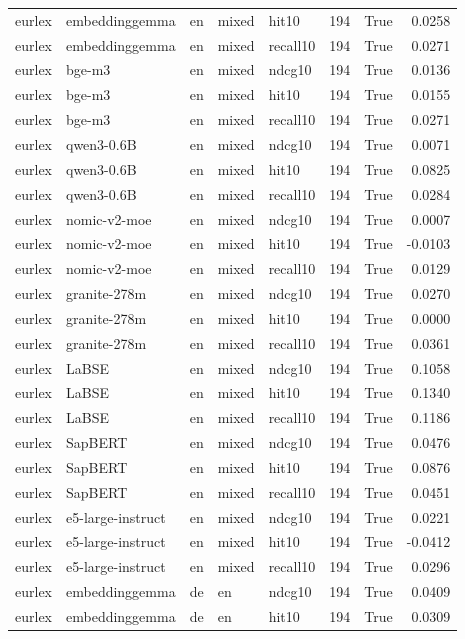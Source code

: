 \begin{tabular}{lllllrrr}
eurlex & embeddinggemma & en & mixed & hit10 & 194 & True & 0.0258 \\
eurlex & embeddinggemma & en & mixed & recall10 & 194 & True & 0.0271 \\
eurlex & bge-m3 & en & mixed & ndcg10 & 194 & True & 0.0136 \\
eurlex & bge-m3 & en & mixed & hit10 & 194 & True & 0.0155 \\
eurlex & bge-m3 & en & mixed & recall10 & 194 & True & 0.0271 \\
eurlex & qwen3-0.6B & en & mixed & ndcg10 & 194 & True & 0.0071 \\
eurlex & qwen3-0.6B & en & mixed & hit10 & 194 & True & 0.0825 \\
eurlex & qwen3-0.6B & en & mixed & recall10 & 194 & True & 0.0284 \\
eurlex & nomic-v2-moe & en & mixed & ndcg10 & 194 & True & 0.0007 \\
eurlex & nomic-v2-moe & en & mixed & hit10 & 194 & True & -0.0103 \\
eurlex & nomic-v2-moe & en & mixed & recall10 & 194 & True & 0.0129 \\
eurlex & granite-278m & en & mixed & ndcg10 & 194 & True & 0.0270 \\
eurlex & granite-278m & en & mixed & hit10 & 194 & True & 0.0000 \\
eurlex & granite-278m & en & mixed & recall10 & 194 & True & 0.0361 \\
eurlex & LaBSE & en & mixed & ndcg10 & 194 & True & 0.1058 \\
eurlex & LaBSE & en & mixed & hit10 & 194 & True & 0.1340 \\
eurlex & LaBSE & en & mixed & recall10 & 194 & True & 0.1186 \\
eurlex & SapBERT & en & mixed & ndcg10 & 194 & True & 0.0476 \\
eurlex & SapBERT & en & mixed & hit10 & 194 & True & 0.0876 \\
eurlex & SapBERT & en & mixed & recall10 & 194 & True & 0.0451 \\
eurlex & e5-large-instruct & en & mixed & ndcg10 & 194 & True & 0.0221 \\
eurlex & e5-large-instruct & en & mixed & hit10 & 194 & True & -0.0412 \\
eurlex & e5-large-instruct & en & mixed & recall10 & 194 & True & 0.0296 \\
eurlex & embeddinggemma & de & en & ndcg10 & 194 & True & 0.0409 \\
eurlex & embeddinggemma & de & en & hit10 & 194 & True & 0.0309 \\

\end{tabular}
